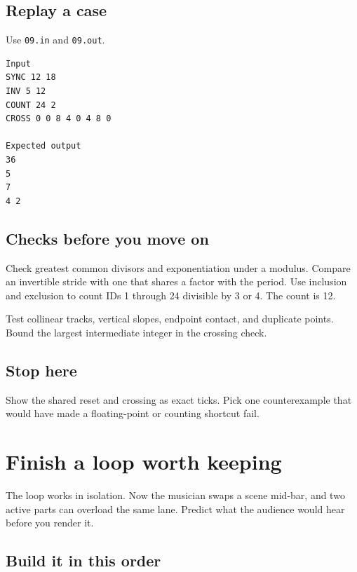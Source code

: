 \documentclass[11pt,letterpaper]{article}
\begin{document}
\subsection*{Replay a case}

Use \texttt{09.in} and \texttt{09.out}.

\begin{samepage}
\small
\begin{verbatim}
Input
SYNC 12 18
INV 5 12
COUNT 24 2
CROSS 0 0 8 4 0 4 8 0

Expected output
36
5
7
4 2
\end{verbatim}
\end{samepage}

\subsection*{Checks before you move on}

Check greatest common divisors and exponentiation under a modulus. Compare an invertible stride with one that shares a factor with the period. Use inclusion and exclusion to count IDs 1 through 24 divisible by 3 or 4. The count is 12.

Test collinear tracks, vertical slopes, endpoint contact, and duplicate points. Bound the largest intermediate integer in the crossing check.

\subsection*{Stop here}

Show the shared reset and crossing as exact ticks. Pick one counterexample that would have made a floating-point or counting shortcut fail.

\clearpage

\section{Finish a loop worth keeping}\label{groovebox:10}

The loop works in isolation. Now the musician swaps a scene mid-bar, and two active parts can overload the same lane. Predict what the audience would hear before you render it.

\subsection*{Build it in this order}
\end{document}
